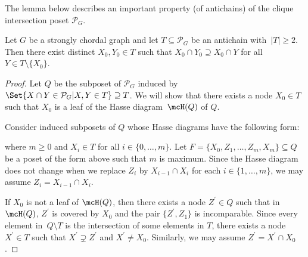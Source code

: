 The lemma below describes an important property (of antichains) of the clique intersection poset $ \mathcal{P}_{G} $.
\begin{lemma}\label{leaf}
Let $ G $ be a strongly chordal graph and let $ T \subseteq \mathcal{P}_{G} $ be an antichain with~$ |T| \geq 2 $.
Then there exist distinct $ X_{0}, Y_{0} \in T $ such that $ X_{0} \cap Y_{0} \supseteq X_{0} \cap Y $ for all $ Y \in T \setminus \{X_{0}\} $. 
\end{lemma}
\begin{proof}
Let $ Q $ be the subposet of $ \mathcal{P}_{G} $ induced by $  \Set{X \cap Y \in \mathcal{P}_{G} | X,Y \in T}  \supseteq T$. 
We will show that there exists a node $ X_{0} \in T $ such that $ X_{0} $ is a leaf of the Hasse diagram~$\mcH(Q)$ of $ Q $. 

Consider induced subposets of $ Q $ whose Hasse diagrams have the following form: 
\begin{center}
\end{center}
where $ m \geq 0 $ and $ X_{i} \in T $ for all $ i \in \{0, \dots, m\} $.
Let $F= \{X_{0}, Z_{1}, \dots, Z_{m},X_{m}\} \subseteq Q $ be a poset of the form above such that $ m $ is maximum. 
Since the Hasse diagram does not change when we replace $ Z_{i} $ by $ X_{i-1} \cap X_{i} $ for each $ i \in \{1, \dots, m\} $, we may assume $ Z_{i} = X_{i-1} \cap X_{i} $. 

If $ X_{0} $ is not a leaf of $\mcH(Q)$, then there exists a node $ Z^{\prime} \in Q $ such that in $\mcH(Q)$,  $ Z^{\prime} $ is covered by $ X_{0} $ and the pair $ \{Z^{\prime}, Z_{1}\} $ is incomparable. 
Since every element in~$ Q\setminus T $ is the intersection of some elements in $ T $, there exists a node $ X^{\prime} \in T $ such that $ X^{\prime} \supsetneq Z^{\prime} $ and $ X^{\prime} \neq X_{0} $. 
Similarly, we may assume $ Z^{\prime} = X^{\prime} \cap X_{0} $. 


\end{proof}
